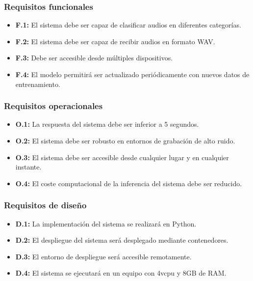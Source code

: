 \subsubsection{Requisitos funcionales}\label{sec:requisitos-funcionales}
\begin{itemize}\itemsep1pt \parskip0pt 
    \item \textbf{F.1:} El sistema debe ser capaz de clasificar audios en diferentes categorías.
    \item \textbf{F.2:} El sistema debe ser capaz de recibir audios en formato WAV.
    \item \textbf{F.3:} Debe ser accesible desde múltiples dispositivos.
    \item \textbf{F.4:} El modelo permitirá ser actualizado periódicamente con nuevos datos de entrenamiento.
\end{itemize}

\subsubsection{Requisitos operacionales}\label{sec:requisitos-operacionales}
\begin{itemize}\itemsep1pt \parskip0pt 
    \item \textbf{O.1:} La respuesta del sistema debe ser inferior a 5 segundos.
    \item \textbf{O.2:} El sistema debe ser robusto en entornos de grabación de alto ruido.
    \item \textbf{O.3:} El sistema debe ser accesible desde cualquier lugar y en cualquier instante.
    \item \textbf{O.4:} El coste computacional de la inferencia del sistema debe ser reducido.
\end{itemize}

\subsubsection{Requisitos de diseño}\label{sec:requisitos-diseno}
\begin{itemize}\itemsep1pt \parskip0pt 
    \item \textbf{D.1:} La implementación del sistema se realizará en Python.
    \item \textbf{D.2:} El despliegue del sistema será desplegado mediante contenedores.
    \item \textbf{D.3:} El entorno de despliegue será accesible remotamente.
    \item \textbf{D.4:} El sistema se ejecutará en un equipo con 4vcpu y 8GB de RAM.
\end{itemize}

